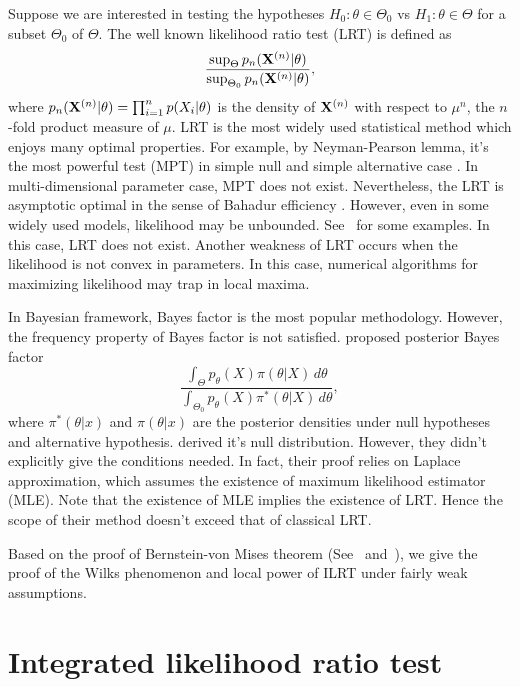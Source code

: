 \documentclass[3p]{elsarticle}
\theoremstyle{plain}
\theoremstyle{definition}
\theoremstyle{remark}
\begin{document}
Suppose we are interested in  testing the hypotheses $H_0:\theta\in \Theta_0$ vs $H_1:\theta\in \Theta$ for a subset $\Theta_0$ of $\Theta$. The well known likelihood ratio test (LRT) is defined as
\begin{equation}
    \frac{\sup_{\Theta} p_n(\mathbf{X}^{(n)}|{\theta})}{\sup_{\Theta_0} p_n(\mathbf{X}^{(n)}|\theta)},
\end{equation}
where $p_n(\mathbf{X}^{(n)}|\theta)=\prod_{i=1}^n p(X_i|\theta)$ is the density of $\mathbf{X}^{(n)}$ with respect to $\mu^n$, the $n$-fold product measure of $\mu$.
LRT is the most widely used statistical method which enjoys many optimal properties. For example, by Neyman-Pearson lemma, it's the most powerful test (MPT) in simple null and simple alternative case \citep{Lehmann}.
In multi-dimensional parameter case, MPT does not exist.
Nevertheless, the LRT is asymptotic optimal in the sense of Bahadur efficiency \citep{MR0315820}.
However, even in some widely used models, likelihood may be unbounded. See~\cite{Cam1990Maximum} for some examples.
In this case, LRT does not exist. Another weakness of LRT occurs when the likelihood is not convex in parameters. In this case, numerical algorithms for maximizing likelihood may trap in local maxima. 


In Bayesian framework, Bayes factor is the most popular methodology.
However, the frequency property of Bayes factor is not satisfied.
\cite{Aitkin1991Posterior} proposed posterior Bayes factor
\begin{equation}
    \frac{\int_{\Theta} p_\theta(X)\pi(\theta|X)\, d\theta}{\int_{\Theta_0}p_\theta(X)\pi^*(\theta|X)\, d\theta},
\end{equation}
where $\pi^*(\theta|x)$ and $\pi(\theta|x)$ are the posterior densities under null hypotheses and alternative hypothesis.
\cite{gelfand1993bayesian} derived it's null distribution.
However, they didn't explicitly give the conditions needed. In fact, their proof relies on Laplace approximation, which assumes the existence of maximum likelihood estimator (MLE). 
Note that the existence of MLE implies the existence of LRT. Hence the scope of their method doesn't exceed that of classical LRT\@.



Based on the proof of Bernstein-von Mises theorem (See~\cite{van2000asymptotic} and~\cite{Kleijn2012The}), we give the proof of the Wilks phenomenon and local power of ILRT under fairly weak assumptions.

\section{Integrated likelihood ratio test}
\end{document}
